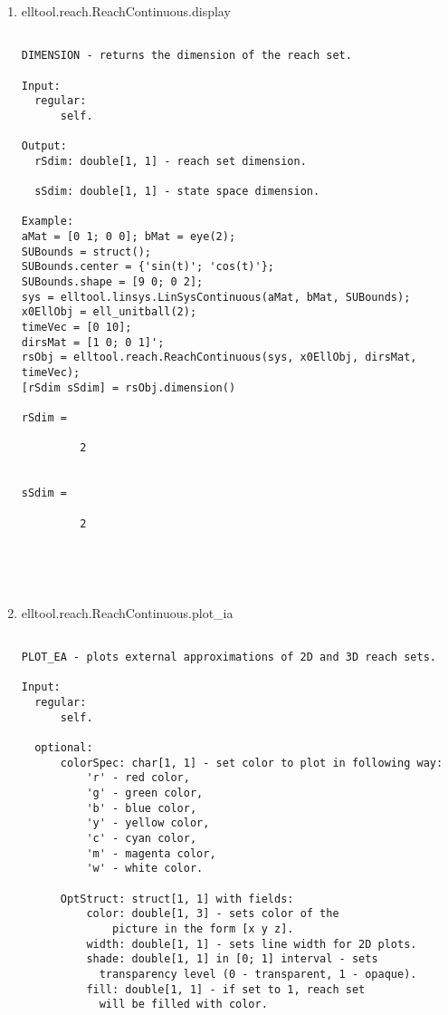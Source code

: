\begin{enumerate}
\begin{lstlisting}
\end{lstlisting}
\fontfamily{\familydefault}
\selectfont
\item {elltool.reach.ReachContinuous.display}
\selectfont
\begin{lstlisting}

DIMENSION - returns the dimension of the reach set.

Input:
  regular:
      self.

Output:
  rSdim: double[1, 1] - reach set dimension.

  sSdim: double[1, 1] - state space dimension.

Example:
aMat = [0 1; 0 0]; bMat = eye(2);
SUBounds = struct();
SUBounds.center = {'sin(t)'; 'cos(t)'};
SUBounds.shape = [9 0; 0 2];
sys = elltool.linsys.LinSysContinuous(aMat, bMat, SUBounds);
x0EllObj = ell_unitball(2);
timeVec = [0 10];
dirsMat = [1 0; 0 1]';
rsObj = elltool.reach.ReachContinuous(sys, x0EllObj, dirsMat, timeVec);
[rSdim sSdim] = rsObj.dimension()

rSdim =

         2


sSdim =

         2





\end{lstlisting}
\fontfamily{\familydefault}
\selectfont
\item {elltool.reach.ReachContinuous.plot\_ia}
\selectfont
\begin{lstlisting}

PLOT_EA - plots external approximations of 2D and 3D reach sets.

Input:
  regular:
      self.

  optional:
      colorSpec: char[1, 1] - set color to plot in following way:
          'r' - red color,
          'g' - green color,
          'b' - blue color,
          'y' - yellow color,
          'c' - cyan color,
          'm' - magenta color,
          'w' - white color.

      OptStruct: struct[1, 1] with fields:
          color: double[1, 3] - sets color of the
              picture in the form [x y z].
          width: double[1, 1] - sets line width for 2D plots.
          shade: double[1, 1] in [0; 1] interval - sets
            transparency level (0 - transparent, 1 - opaque).
          fill: double[1, 1] - if set to 1, reach set
            will be filled with color.


\end{lstlisting}
\end{enumerate}
